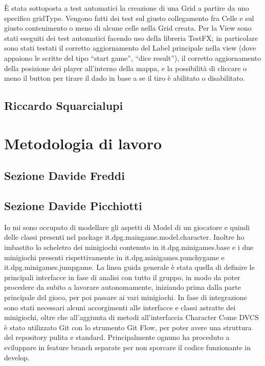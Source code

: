 \documentclass[a4paper,12pt]{report}
\begin{document}
	È stata sottoposta a test automatici la creazione di una Grid a partire da uno specifico gridType.
	Vengono fatti dei test sul giusto collegamento fra Celle e sul giusto contenimento o meno di alcune celle nella Grid creata.
	Per la View sono stati eseguiti dei test automatici facendo uso della libreria TestFX; in particolare sono stati testati il corretto aggiornamento del Label principale nella view (dove appaiono le scritte del tipo “start game”, “dice result”),
	il corretto aggiornamento della posizione dei player all'interno della mappa, e la possibilità di cliccare o meno il button per tirare il dado in base a se il tiro è abilitato o disabilitato.


	\subsection{Riccardo Squarcialupi}

	\section{Metodologia di lavoro}

	\subsection{Sezione Davide Freddi}
	\subsection{Sezione Davide Picchiotti}

    Io mi sono occupato di modellare gli aspetti di Model di un giocatore e quindi delle classi presenti nel package it.dpg.maingame.model.character.\newline
    Inoltre ho imbastito lo scheletro dei minigiochi contenuto in it.dpg.minigames.base e i due minigiochi presenti rispettivamente in it.dpg.minigames.punchygame e it.dpg.minigames.jumpgame.\newline
    La linea guida generale è stata quella di definire le principali interfacce in fase di analisi con tutto il gruppo, in modo da poter procedere da subito a lavorare autonomamente,
    iniziando prima dalla parte principale del gioco, per poi passare ai vari minigiochi.\newline
    In fase di integrazione sono stati necessari alcuni accorgimenti alle interfacce e classi astratte dei minigiochi, oltre che all'aggiunta di metodi all'interfaccia Character\newline
    Come DVCS è stato utilizzato Git con lo strumento Git Flow, per poter avere una struttura del repository pulita e standard.
    Principalmente ognuno ha proceduto a sviluppare in feature branch separate per non sporcare il codice funzionante in develop.
\end{document}
